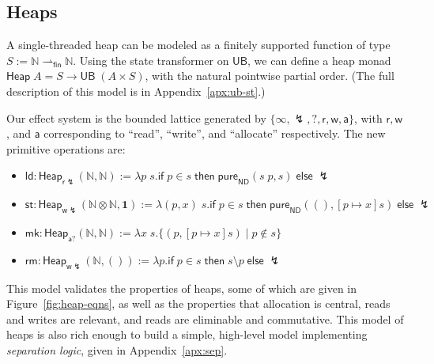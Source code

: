 \documentclass[acmsmall,screen,review]{acmart}
\newcommand{\mb}[1]{\ensuremath{\mathbf{#1}}}
\newcommand{\ms}[1]{\ensuremath{\mathsf{#1}}}
\newcommand{\nats}{\mathbb{N}}
\newcommand{\pto}{\rightharpoonup}
\newcommand{\fpto}{\pto_{\ms{fin}}}
\newcommand{\ubeff}{\lightning}
\begin{document}
\subsection{Heaps}

A single-threaded heap can be modeled
as a finitely supported function of type $S := \nats \fpto \nats$. Using the state transformer on
 $\ms{UB}$, we can define a heap monad 
$\ms{Heap}\;A = S \to \ms{UB}\;(A \times S)$, with the natural pointwise partial order.
(The full description of this model is in Appendix~\ref{apx:ub-st}.)

Our effect system is the bounded lattice generated by 
$\{\infty, \ubeff, ?, \ms{r}, \ms{w}, \ms{a}\}$, with $\ms{r}, \ms{w}$, and $\ms{a}$ corresponding to 
``read'', ``write'', and ``allocate'' respectively. The new primitive operations are:
\begin{itemize}
  \item $\ms{ld} : \ms{Heap}_{\ms{r}\ubeff}(\nats, \nats) := 
    \lambda p\; s.
      \ms{if}\;p \in s\;\ms{then}\;\ms{pure}_{\ms{ND}}(s\;p, s)\;\ms{else}\;\ubeff
    $
  \item $\ms{st} : \ms{Heap}_{\ms{w}\ubeff}(\nats \otimes \nats, \mb{1}) :=
    \lambda (p, x)\; s.
      \ms{if}\;p \in s\;\ms{then}\;\ms{pure}_{\ms{ND}}((), [p \mapsto x]s)\;\ms{else}\;\ubeff
    $
  \item $\ms{mk} : \ms{Heap}_{\ms{a}?}(\nats, \nats) :=
    \lambda x\; s. \{(p, [p \mapsto x]s) \mid p \notin s\}
    $
  \item $\ms{rm} : \ms{Heap}_{\ms{w}\ubeff}(\nats, ()) :=
    \lambda p . \ms{if}\;p \in s\;\ms{then}\;s \setminus p\;\ms{else}\;\ubeff
    $
\end{itemize}
This model validates the properties of heaps, some of which are given in 
Figure~\ref{fig:heap-eqns}, as well as the properties that allocation is central, reads and writes are relevant, and reads are eliminable and commutative.
%
This model of heaps is also rich enough
to build a simple, high-level model implementing \emph{separation logic}, given in Appendix~\ref{apx:sep}.
\end{document}
